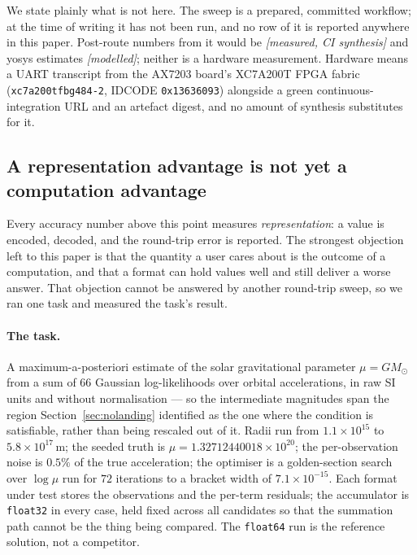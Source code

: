 We state plainly what is not here. The sweep is a prepared, committed workflow;
at the time of writing it has not been run, and no row of it is reported anywhere
in this paper. Post-route numbers from it would be \emph{[measured, CI synthesis]}
and yosys estimates \emph{[modelled]}; neither is a hardware measurement. Hardware
means a UART transcript from the AX7203 board's XC7A200T FPGA fabric
(\texttt{xc7a200tfbg484-2}, IDCODE \texttt{0x13636093}) alongside a green
continuous-integration URL and an artefact digest, and no amount of synthesis
substitutes for it.

\subsection{A representation advantage is not yet a computation advantage}
\label{sec:downstream}

Every accuracy number above this point measures \emph{representation}: a value is
encoded, decoded, and the round-trip error is reported. The strongest objection
left to this paper is that the quantity a user cares about is the outcome of a
computation, and that a format can hold values well and still deliver a worse
answer. That objection cannot be answered by another round-trip sweep, so we ran
one task and measured the task's result.

\paragraph{The task.} A maximum-a-posteriori estimate of the solar gravitational
parameter $\mu = GM_{\odot}$ from a sum of $66$ Gaussian log-likelihoods over
orbital accelerations, in raw SI units and without normalisation --- so the
intermediate magnitudes span the region Section~\ref{sec:nolanding} identified as
the one where the condition is satisfiable, rather than being rescaled out of it.
Radii run from $1.1\times 10^{15}$ to $5.8\times 10^{17}$\,m; the seeded truth is
$\mu = 1.32712440018\times 10^{20}$; the per-observation noise is $0.5\%$ of the
true acceleration; the optimiser is a golden-section search over $\log\mu$ run for
$72$ iterations to a bracket width of $7.1\times 10^{-15}$. Each format under test
stores the observations and the per-term residuals; the accumulator is
\texttt{float32} in every case, held fixed across all candidates so that the
summation path cannot be the thing being compared. The
\texttt{float64} run is the reference solution, not a competitor.

